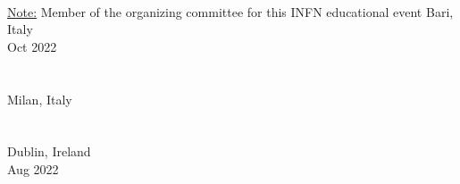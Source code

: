 \begin{cvcontent}
  \\ [0.5mm]
  \ul{Note:} Member of the organizing committee for this INFN educational event
  \newpage\noindent
  \hypertarget{acat-2022}{\null}\noindent
    {Bari, Italy}\\ [0.5mm]
    {Oct 2022}\\ [0.5mm]
  \hfill
  \href{https://mbarbetti.github.io/poster-acat2022-lamarr/poster.html}{\faLink}
  \href{https://indico.cern.ch/event/1106990/contributions/4991348/attachments/2529001/4363319/lamarr_poster_acat2022.pdf}{\faFilePdf[regular]}
  \href{https://indico.cern.ch/event/1106990/contributions/4991348}{\faGlobe}
  \\ [0.5mm]
  \hfill
  \href{https://mbarbetti.github.io/poster-acat2022-hopaas/poster.html}{\faLink}
  \href{https://indico.cern.ch/event/1106990/contributions/4991351/attachments/2532524/4357741/hopaas_poster_acat2022.pdf}{\faFilePdf[regular]}
  \href{https://indico.cern.ch/event/1106990/contributions/4991351}{\faGlobe}
  \\ [5mm]
  \hypertarget{sif-2022}{\null}\noindent
    {Milan, Italy}\\ [0.5mm]
  \\ [0.5mm]
  \hfill
  \href{https://local.sif.it/repository/108/atticon14493}{\faFilePdf[regular]}
  \href{https://2022.congresso.sif.it/talk/525}{\faGlobe}
  \\ [5mm]
  \hypertarget{ecmp-2022}{\null}\noindent
    {Dublin, Ireland}\\ [0.5mm]
    {Aug 2022}\\ [0.5mm]

\end{cvcontent}
